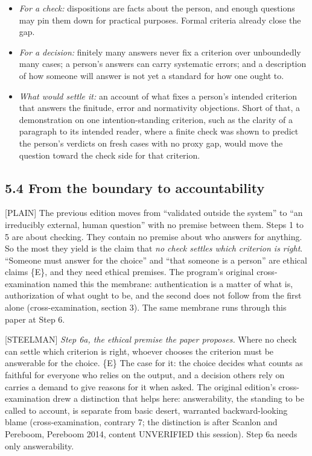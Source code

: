 \documentclass[11pt]{article}
\newcommand{\register}[1]{{\ttfamily\small #1}}
\begin{document}
\begin{itemize}
\item \emph{For a check:} dispositions are facts about the person, and enough questions may pin them down for practical purposes. Formal criteria already close the gap.
\item \emph{For a decision:} finitely many answers never fix a criterion over unboundedly many cases; a person's answers can carry systematic errors; and a description of how someone will answer is not yet a standard for how one ought to.
\item \emph{What would settle it:} an account of what fixes a person's intended criterion that answers the finitude, error and normativity objections. Short of that, a demonstration on one intention-standing criterion, such as the clarity of a paragraph to its intended reader, where a finite check was shown to predict the person's verdicts on fresh cases with no proxy gap, would move the question toward the check side for that criterion.
\end{itemize}
\subsection*{5.4 From the boundary to accountability}

\register{[PLAIN]} The previous edition moves from ``validated outside the system'' to ``an irreducibly external, human question'' with no premise between them. Steps 1 to 5 are about checking. They contain no premise about who answers for anything. So the most they yield is the claim that \emph{no check settles which criterion is right}. ``Someone must answer for the choice'' and ``that someone is a person'' are ethical claims \{E\}, and they need ethical premises. The program's original cross-examination named this the membrane: authentication is a matter of what is, authorization of what ought to be, and the second does not follow from the first alone (cross-examination, section 3). The same membrane runs through this paper at Step 6.

\register{[STEELMAN]} \emph{Step 6a, the ethical premise the paper proposes.} Where no check can settle which criterion is right, whoever chooses the criterion must be answerable for the choice. \{E\} The case for it: the choice decides what counts as faithful for everyone who relies on the output, and a decision others rely on carries a demand to give reasons for it when asked. The original edition's cross-examination drew a distinction that helps here: answerability, the standing to be called to account, is separate from basic desert, warranted backward-looking blame (cross-examination, contrary 7; the distinction is after Scanlon and Pereboom, Pereboom 2014, content UNVERIFIED this session). Step 6a needs only answerability.
\end{document}
